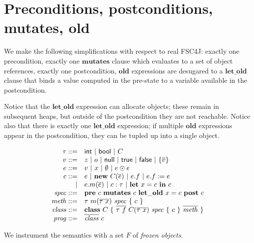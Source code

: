 \documentclass{article}
\newcommand{\op}{\odot}
\begin{document}
\section{Preconditions, postconditions, mutates, old}

We make the following simplifications with respect to real FSC4J: exactly one precondition, exactly one $\mathbf{mutates}$ clause which evaluates to a set of object references, exactly one postcondition, $\mathbf{old}$ expressions are desugared to a $\mathbf{let\_old}$ clause that binds a value computed in the pre-state to a variable available in the postcondition.

Notice that the $\mathbf{let\_old}$ expression can allocate objects; these remain in subsequent heaps, but outside of the postcondition they are not reachable. Notice also that there is exactly one $\mathbf{let\_old}$ expression; if multiple $\mathbf{old}$ expressions appear in the postcondition, they can be tupled up into a single object.

$$\begin{array}{r l}
\tau ::= & \mathsf{int}\ |\ \mathsf{bool}\ |\ C\\
v ::= & z\ |\ o\ |\ \mathsf{null}\ |\ \mathsf{true}\ |\ \mathsf{false}\ |\ \{\overline{v}\}\\
e ::= & v\ |\ x\ |\ \emptyset\ |\ e \op e\\
c ::= & e\ |\ \mathbf{new}\ C(\overline{e})\ |\ e.f\ |\ e.f := e\\
| & e.m(\overline{e})\ |\ c : \tau\ |\ \mathbf{let}\ x = c\ \mathbf{in}\ c\\
\mathit{spec} ::= & \mathbf{pre}\ c\ \mathbf{mutates}\ c\ \mathbf{let\_old}\ x = c\ \mathbf{post}\ c\\
\mathit{meth} ::= & \tau\ m(\overline{\tau\ x})\ \mathit{spec}\ \{\ c\ \}\\
\mathit{class} ::= & \mathbf{class}\ C\ \{\ \overline{\tau\ f}\ C(\overline{\tau\ x})\ \mathit{spec}\ \{\ c\ \}\ \overline{\mathit{meth}}\ \}\\
\mathit{prog} ::= & \overline{\mathit{class}}\ c
\end{array}$$

We instrument the semantics with a set $F$ of \emph{frozen objects}.
\end{document}
